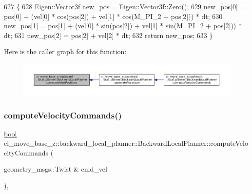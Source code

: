 \begin{DoxyCode}
627         \{
628             Eigen::Vector3f new\_pos = Eigen::Vector3f::Zero();
629             new\_pos[0] = pos[0] + (vel[0] * cos(pos[2]) + vel[1] * cos(M\_PI\_2 + pos[2])) * dt;
630             new\_pos[1] = pos[1] + (vel[0] * sin(pos[2]) + vel[1] * sin(M\_PI\_2 + pos[2])) * dt;
631             new\_pos[2] = pos[2] + vel[2] * dt;
632             \textcolor{keywordflow}{return} new\_pos;
633         \}
\end{DoxyCode}
Here is the caller graph for this function\+:
\nopagebreak
\begin{figure}[H]
\begin{center}
\leavevmode
\includegraphics[width=350pt]{classcl__move__base__z_1_1backward__local__planner_1_1BackwardLocalPlanner_a0fe2ebd23fd79e8b574127e819ef0e14_icgraph}
\end{center}
\end{figure}
\mbox{\label{classcl__move__base__z_1_1backward__local__planner_1_1BackwardLocalPlanner_a25437208766366ca22f967fe72e80988}} 
\subsubsection{\texorpdfstring{compute\+Velocity\+Commands()}{computeVelocityCommands()}}
{\footnotesize\ttfamily \hyperlink{classbool}{bool} cl\+\_\+move\+\_\+base\+\_\+z\+::backward\+\_\+local\+\_\+planner\+::\+Backward\+Local\+Planner\+::compute\+Velocity\+Commands (\begin{DoxyParamCaption}\item[{geometry\+\_\+msgs\+::\+Twist \&}]{cmd\+\_\+vel }\end{DoxyParamCaption})\hspace{0.3cm}{\ttfamily [override]}, {\ttfamily [virtual]}}



